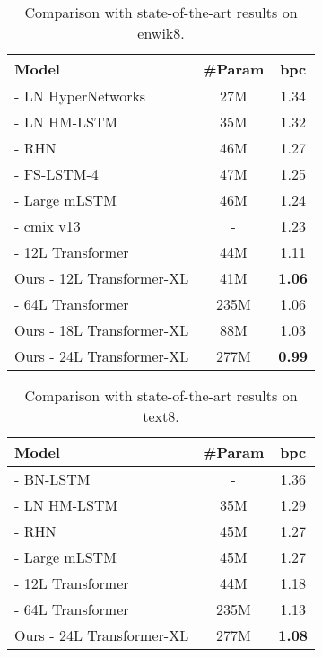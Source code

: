 \bgroup
\setlength{\tabcolsep}{3pt}
\begin{table}[t]
    \small
    \centering
    \begin{tabular}{l|cc}
        \toprule
        \bf Model & \bf \#Param & \bf bpc \\
        \midrule
        \citet{ha2016hypernetworks} - LN HyperNetworks & 27M & 1.34 \\
        \citet{chung2016hierarchical} - LN HM-LSTM & 35M & 1.32 \\
        \citet{zilly2016recurrent} - RHN & 46M & 1.27 \\
        \citet{mujika2017fast} - FS-LSTM-4 & 47M & 1.25 \\
        \citet{krause2016multiplicative} - Large mLSTM & 46M & 1.24 \\
        \citet{cmix} - cmix v13 & - & 1.23 \\
        \citet{al2018character} - 12L Transformer & 44M & 1.11 \\
        Ours - 12L Transformer-XL & 41M & \textbf{1.06} \\
        \midrule
        \citet{al2018character} - 64L Transformer & 235M & 1.06 \\
        Ours - 18L Transformer-XL & 88M & 1.03 \\
        Ours - 24L Transformer-XL & 277M & \textbf{0.99} \\
        \bottomrule
    \end{tabular}
    \caption{\small
        Comparison with state-of-the-art results on enwik8.
    }
    \label{table:enwik8}
\end{table}
\egroup

\bgroup
\setlength{\tabcolsep}{3pt}
\begin{table}[t]
    \small
    \centering
    \begin{tabular}{l|cc}
        \toprule
        \bf Model & \bf \#Param & \bf bpc \\
        \midrule
        \citet{cooijmans2016recurrent} - BN-LSTM & - & 1.36 \\
        \citet{chung2016hierarchical} - LN HM-LSTM & 35M & 1.29 \\
        \citet{zilly2016recurrent} - RHN & 45M & 1.27 \\
        \citet{krause2016multiplicative} - Large mLSTM & 45M & 1.27 \\
        \citet{al2018character} - 12L Transformer & 44M & 1.18 \\
        \midrule
        \citet{al2018character} - 64L Transformer & 235M & 1.13 \\
        Ours - 24L Transformer-XL & 277M & \textbf{1.08} \\
        \bottomrule
    \end{tabular}
    \caption{\small
        Comparison with state-of-the-art results on text8.
    }
    \label{table:text8}
\end{table}
\egroup

